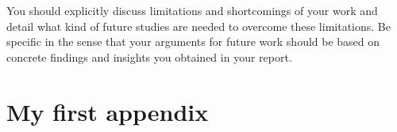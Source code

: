 \documentclass[12pt,a4paper,footinclude=true,twoside,headinclude=true]{report}
\begin{document}
You should explicitly discuss limitations and shortcomings of your work and detail what kind of future studies are needed to overcome these limitations. Be specific in the sense that your arguments for future work should be based on concrete findings and insights you obtained in your report. 





\appendix 
{}

\listoffigures
\listoftables

\chapter{My first appendix}\label{sec:appendix1}
\end{document}
